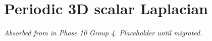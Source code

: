 \chapter{Periodic 3D scalar Laplacian}
\label{chap:dev-laplacian}

\textit{Absorbed from 
in Phase 10 Group 4. Placeholder until migrated.}
